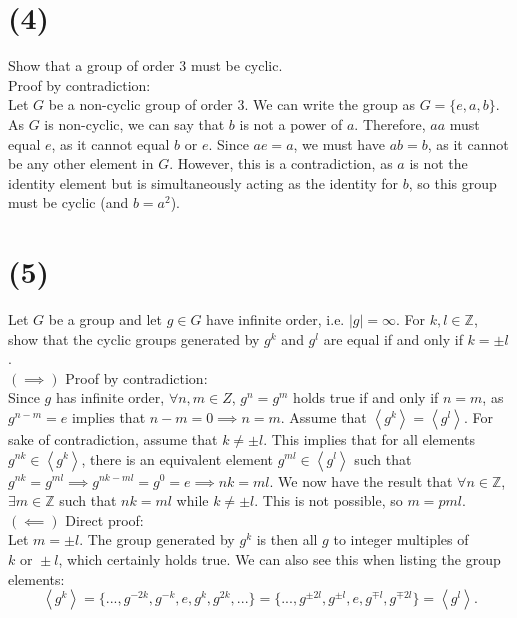 \documentclass[12pt,letterpaper]{article}
\begin{document}
\section*{(4)}
Show that a group of order 3 must be cyclic. \\

Proof by contradiction: \\

Let \(G\) be a non-cyclic group of order 3. We can write the group as \(G = \{e, a, b\}\). As \(G\) is non-cyclic, we can say that \(b\) is not a power of \(a\). Therefore, \(aa\) must equal \(e\), as it cannot equal \(b\) or \(e\). Since \(ae = a\), we must have \(ab = b\), as it cannot be any other element in \(G\). However, this is a contradiction, as \(a\) is not the identity element but is simultaneously acting as the identity for \(b\), so this group must be cyclic (and \(b = a^{2}\)).

\section*{(5)}
Let \(G\) be a group and let \(g \in G\) have infinite order, i.e. \(|g| = \infty\). For \(k,l \in \mathbb{Z}\), show that the cyclic groups generated by \(g^{k}\) and \(g^{l}\) are equal if and only if \(k = \pm l\). \\

\((\implies)\) Proof by contradiction: \\

Since \(g\) has infinite order, \(\forall n,m \in Z\), \(g^{n} = g^{m}\) holds true if and only if \(n = m\), as \(g^{n-m} = e\) implies that \(n - m = 0 \implies n = m\). Assume that \(\left<g^{k}\right> = \left<g^{l}\right>\). For sake of contradiction, assume that \(k \neq \pm l\). This implies that for all elements \(g^{nk} \in \left<g^{k}\right>\), there is an equivalent element \(g^{ml} \in \left<g^{l}\right>\) such that \(g^{nk} = g^{ml} \implies g^{nk-ml} = g^{0} = e \implies nk = ml\).  We now have the result that \(\forall n\in \mathbb{Z}\), \(\exists m \in \mathbb{Z}\) such that \(nk = ml\) while \(k \neq \pm l\). This is not possible, so \(m = pm l\). \\

\((\impliedby)\) Direct proof: \\

Let \(m = \pm l\). The group generated by \(g^{k}\) is then all \(g\) to integer multiples of \(k \text{ or } \pm l\), which certainly holds true. We can also see this when listing the group elements: \[\left<g^{k}\right> = \{..., g^{-2k}, g^{-k}, e, g^{k}, g^{2k}, ...\} = \{..., g^{\pm 2l}, g^{\pm l}, e, g^{\mp l}, g^{\mp 2l}\} = \left< g^{l} \right>.\]
\end{document}
